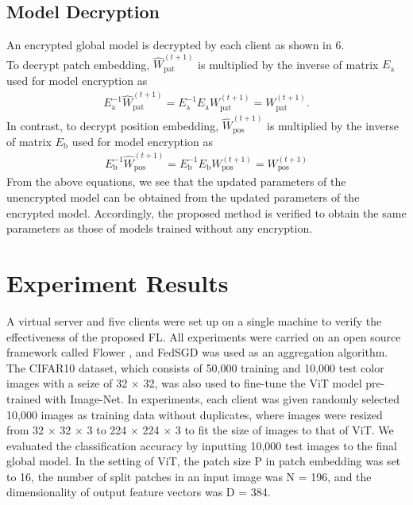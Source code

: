 \documentclass[conference, a4paper]{IEEEtran}
\begin{document}
\subsection{Model Decryption}
An encrypted global model is decrypted by each client as shown in \textcircled{\scriptsize{6}}. \\
\indent To decrypt patch embedding, $\widehat{W}_{\text{pat}}^{(t+1)}$ is multiplied by the inverse of matrix $E_{\text{a}}$ used for model encryption as
\begin{gather}
  E_{\text{a}}^{-1} \widehat{W}_{\text{pat}}^{(t+1)} = E_{\text{a}}^{-1} E_{\text{a}} W_{\text{pat}}^{(t+1)} = W_{\text{pat}}^{(t+1)}.
\end{gather}
In contrast, to decrypt position embedding, $\widehat{W}_{\text{pos}}^{(t+1)}$ is multiplied by the inverse of matrix $E_{\text{b}}$ used for model encryption as
\begin{gather}
  E_{\text{b}}^{-1} \widehat{W}_{\text{pos}}^{(t+1)} = E_{\text{b}}^{-1} E_{\text{b}} W_{\text{pos}}^{(t+1)} = W_{\text{pos}}^{(t+1)}
\end{gather}
From the above equations, we see that the updated parameters of the unencrypted model can be obtained from the updated parameters of the encrypted model. Accordingly, the proposed method is verified to obtain the same parameters as those of models trained without any encryption.

\section{Experiment Results}
A virtual server and five clients were set up on a single machine to verify the effectiveness of the proposed FL. All experiments were carried on an open source framework called Flower \cite{beutel2022flower}, and FedSGD\cite{pmlr-v54-mcmahan17a} was used as an aggregation algorithm. The CIFAR10 dataset, which consists of 50,000 training and 10,000 test color images with a seize of 32 × 32, was also used to fine-tune the ViT model pre-trained with Image-Net. In experiments, each client was given randomly selected 10,000 images as training data without duplicates, where images were resized from 32 × 32 × 3 to 224 × 224 × 3 to fit the size of images to that of ViT. We evaluated the classification accuracy by inputting 10,000 test images to the final global model. In the setting of ViT, the patch size P in patch embedding was set to 16, the number of split patches in an input image was N = 196, and the dimensionality of output feature vectors was D = 384.
\end{document}
